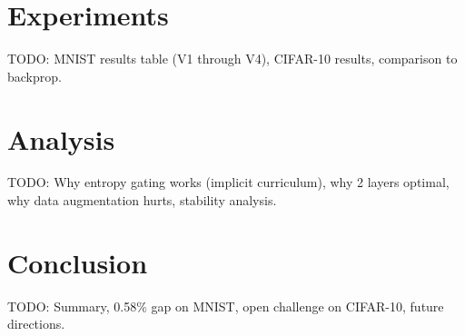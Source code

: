 \documentclass[11pt]{article}
\begin{document}
\section{Experiments}
TODO: MNIST results table (V1 through V4), CIFAR-10 results, comparison to backprop.

\section{Analysis}
TODO: Why entropy gating works (implicit curriculum), why 2 layers optimal,
why data augmentation hurts, stability analysis.

\section{Conclusion}
TODO: Summary, 0.58\% gap on MNIST, open challenge on CIFAR-10, future directions.



\end{document}
